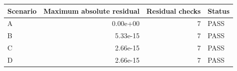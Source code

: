 \begin{tabular}{lrrl}
\toprule
Scenario & Maximum absolute residual & Residual checks & Status \\
\midrule
A & 0.00e+00 & 7 & PASS \\
B & 5.33e-15 & 7 & PASS \\
C & 2.66e-15 & 7 & PASS \\
D & 2.66e-15 & 7 & PASS \\
\bottomrule
\end{tabular}
